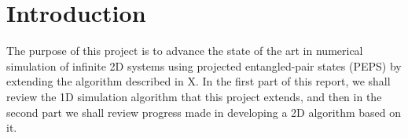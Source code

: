 \documentclass{article}
\begin{document}
\section{Introduction}

The purpose of this project is to advance the state of the art in numerical simulation of infinite 2D systems using projected entangled-pair states (PEPS) by extending the algorithm described in X.  In the first part of this report, we shall review the 1D simulation algorithm that this project extends, and then in the second part we shall review progress made in developing a 2D algorithm based on it.
\end{document}
